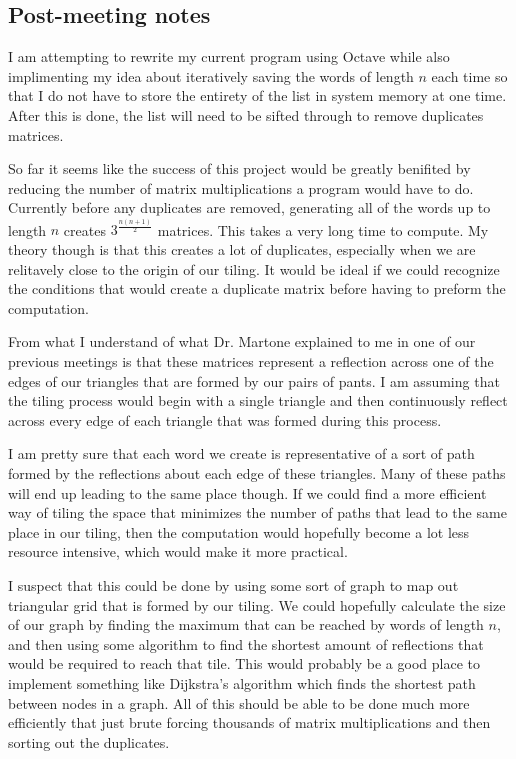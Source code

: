 \documentclass{amsart}
\begin{document}
\subsection{Post-meeting notes}

I am attempting to rewrite my current program using Octave while also implimenting my idea about iteratively saving the words of length $n$ each time so that I do not have to store the entirety of the list in system memory at one time. After this is done, the list will need to be sifted through to remove duplicates matrices. 

So far it seems like the success of this project would be greatly benifited by reducing the number of matrix multiplications a program would have to do. Currently before any duplicates are removed, generating all of the words up to length $n$ creates $3^{\frac{n(n+1)}{2}}$ matrices. This takes a very long time to compute. My theory though is that this creates a lot of duplicates, especially when we are relitavely close to the origin of our tiling. It would be ideal if we could recognize the conditions that would create a duplicate matrix before having to preform the computation.

From what I understand of what Dr. Martone explained to me in one of our previous meetings is that these matrices represent a reflection across one of the edges of our triangles that are formed by our pairs of pants. I am assuming that the tiling process would begin with a single triangle and then continuously reflect across every edge of each triangle that was formed during this process. 

I am pretty sure that each word we create is representative of a sort of path formed by the reflections about each edge of these triangles. Many of these paths will end up leading to the same place though.  If we could find a more efficient way of tiling the space that minimizes the number of paths that lead to the same place in our tiling, then the computation would hopefully become a lot less resource intensive, which would make it more practical. 

I suspect that this could be done by using some sort of graph to map out triangular grid that is formed by our tiling. We could hopefully calculate the size of our graph by finding the maximum  that can be reached by words of length $n$, and then using some algorithm to find the shortest amount of reflections that would be required to reach that tile. This would probably be a good place to implement something like Dijkstra's algorithm which finds the shortest path between nodes in a graph. All of this should be able to be done much more efficiently that just brute forcing thousands of matrix multiplications and then sorting out the duplicates. 
\end{document}
